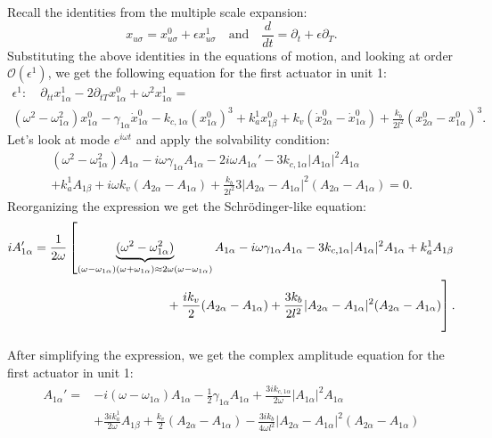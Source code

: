 \documentclass[11pt, a4paper]{article} %
\begin{document}
\begin{appendices}
Recall the identities from the multiple scale expansion:
\begin{equation}
x_{u\sigma} = x_{u\sigma}^0 + \epsilon x_{u\sigma}^1 \quad \text{and} \quad \frac{d}{dt} = \partial_t + \epsilon \partial_T.
\end{equation}
Substituting the above identities in the equations of motion, and looking at order $\mathcal{O}(\epsilon^1)$, 
we get the following equation for the first actuator in unit 1:
\begin{multline}
\epsilon^1:\quad 
\partial_{tt} x_{1\alpha}^1 - 2\partial_{tT} x_{1\alpha}^0 + \omega^2 x_{1\alpha}^1 = \\
(\omega^2 - \omega_{1\alpha}^2)x_{1\alpha}^0 - \gamma_{1\alpha} \dot{x}_{1\alpha}^0 
- k_{c,1\alpha}(x_{1\alpha}^0)^3 + k_a^{1} x_{1\beta}^0 + k_v (\dot{x}_{2\alpha}^0 - \dot{x}_{1\alpha}^0) 
+ \frac{k_b}{2l^2}(x_{2\alpha}^0 - x_{1\alpha}^0)^3.
\end{multline}
Let's look at mode $e^{i \omega t}$ and apply the solvability condition:
 \begin{multline}
(\omega^2 - \omega_{1\alpha}^2) A_{1\alpha} - i \omega \gamma_{1\alpha} A_{1\alpha} - 2i \omega A_{1\alpha}' 
- 3k_{c,1\alpha} |A_{1\alpha}|^2 A_{1\alpha} \\ 
+ k_a^{1} A_{1\beta} 
+ i\omega k_v (A_{2\alpha} - A_{1\alpha}) + \frac{k_b}{2l^2} 3 |A_{2\alpha} - A_{1\alpha}|^2 (A_{2\alpha} - A_{1\alpha}) = 0.
\end{multline}
Reorganizing the expression we get the Schrödinger-like equation:
\begin{equation}
\begin{split}
i A_{1\alpha}' = \frac{1}{2\omega} \left[ 
\underbrace{(\omega^2 - \omega_{1\alpha}^2)}_{(\omega - \omega_{1\alpha})(\omega + \omega_{1\alpha})\approx 2\omega(\omega - \omega_{1\alpha})} A_{1\alpha} 
- i \omega \gamma_{1\alpha} A_{1\alpha} - 3k_{c,1\alpha} |A_{1\alpha}|^2 A_{1\alpha} 
+ k_a^{1} A_{1\beta} \right. \\
\left. \vphantom{\underbrace{(\omega^2 - \omega_{1\alpha}^2)}_{(\omega - \omega_{1\alpha})(\omega + \omega_{1\alpha})\approx 2\omega(\omega - \omega_{1\alpha})}}
+ \frac{ik_v}{2} (A_{2\alpha} - A_{1\alpha}) + \frac{3k_b}{2l^2} |A_{2\alpha} - A_{1\alpha}|^2 (A_{2\alpha} - A_{1\alpha}) \right].
\end{split}
\end{equation}

After simplifying the expression, we get the complex amplitude equation for the first actuator in unit 1:
\begin{align}
A_{1\alpha}' =& -i(\omega - \omega_{1\alpha}) A_{1\alpha} - \frac{1}{2} \gamma_{1\alpha} A_{1\alpha} 
+ \frac{3i k_{c,1\alpha}}{2\omega} |A_{1\alpha}|^2 A_{1\alpha} \\
&+ \frac{3i k_a^{1}}{2\omega} A_{1\beta} 
+ \frac{k_v}{2} (A_{2\alpha} - A_{1\alpha}) - \frac{3i k_b}{4\omega l^2} |A_{2\alpha} - A_{1\alpha}|^2 (A_{2\alpha} - A_{1\alpha})
\label{eq_MSE_2nodes_complex_amplitude}
\end{align}


\end{appendices}
\end{document}

